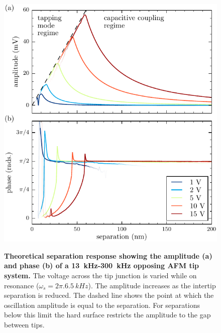 \documentclass{article}
\begin{document}
\begin{figure}[bt]
\centering
{\includegraphics{figures/afm_theory_separation_response}}
{\caption[Theoretical separation response showing the amplitude (a) and phase (b) of a \SI{13}{kHz}-\SI{300}{kHz} opposing AFM tip system]{\textbf{Theoretical separation response showing the amplitude (a) and phase (b) of a \SI{13}{kHz}-\SI{300}{kHz} opposing AFM tip system.} The voltage across the tip junction is varied while on resonance ($\omega_s = 2\pi.\SI{6.5}{kHz}$). The amplitude increases as the intertip separation is reduced. The dashed line shows the point at which the oscillation amplitude is equal to the separation. For separations below this limit the hard surface restricts the amplitude to the gap between tips.}
\label{fig:num_sep_resp}}
\end{figure}
\end{document}
